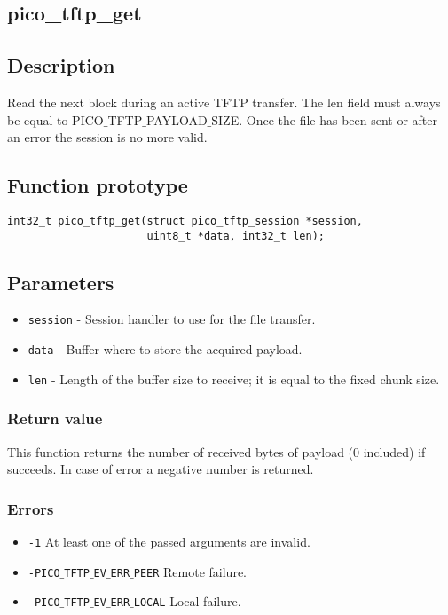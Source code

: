 \subsection{pico\_tftp\_get}

\subsection*{Description}
Read the next block during an active TFTP transfer. The len field must always be equal to PICO$\_$TFTP$\_$PAYLOAD$\_$SIZE. Once the file has been sent or after an error the session is no more valid.

\subsection*{Function prototype}
\begin{verbatim}
int32_t pico_tftp_get(struct pico_tftp_session *session,
                      uint8_t *data, int32_t len);
\end{verbatim}

\subsection*{Parameters}
\begin{itemize}[noitemsep]
\item \texttt{session} - Session handler to use for the file transfer.
\item \texttt{data} - Buffer where to store the acquired payload.
\item \texttt{len} - Length of the buffer size to receive; it is equal to the fixed chunk size.
\end{itemize}

\subsubsection*{Return value}
This function returns the number of received bytes of payload (0 included) if succeeds. In case of error a negative number is returned.

\subsubsection*{Errors}
\begin{itemize}[noitemsep]
\item \texttt{-1} At least one of the passed arguments are invalid.
\item \texttt{-PICO$\_$TFTP$\_$EV$\_$ERR$\_$PEER} Remote failure.
\item \texttt{-PICO$\_$TFTP$\_$EV$\_$ERR$\_$LOCAL} Local failure.
\end{itemize}

